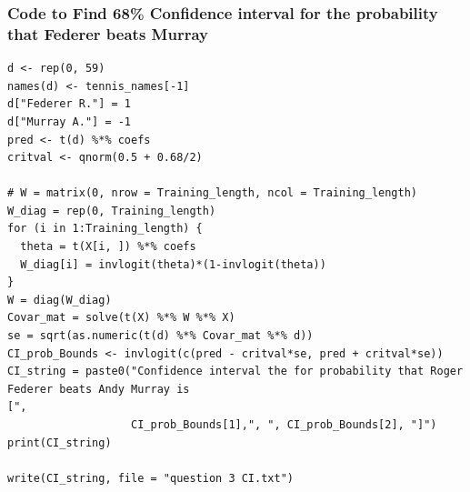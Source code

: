 \documentclass[11pt]{article} %
\begin{document}
\subsubsection*{Code to Find 68\% Confidence interval for the probability that Federer beats Murray}
\begin{lstlisting}
d <- rep(0, 59)
names(d) <- tennis_names[-1]
d["Federer R."] = 1
d["Murray A."] = -1
pred <- t(d) %*% coefs
critval <- qnorm(0.5 + 0.68/2)

# W = matrix(0, nrow = Training_length, ncol = Training_length)
W_diag = rep(0, Training_length)
for (i in 1:Training_length) {
  theta = t(X[i, ]) %*% coefs
  W_diag[i] = invlogit(theta)*(1-invlogit(theta))
}
W = diag(W_diag)
Covar_mat = solve(t(X) %*% W %*% X)
se = sqrt(as.numeric(t(d) %*% Covar_mat %*% d))
CI_prob_Bounds <- invlogit(c(pred - critval*se, pred + critval*se))
CI_string = paste0("Confidence interval the for probability that Roger Federer beats Andy Murray is 
[",
                   CI_prob_Bounds[1],", ", CI_prob_Bounds[2], "]")
print(CI_string)

write(CI_string, file = "question 3 CI.txt")
\end{lstlisting}
\end{document}
